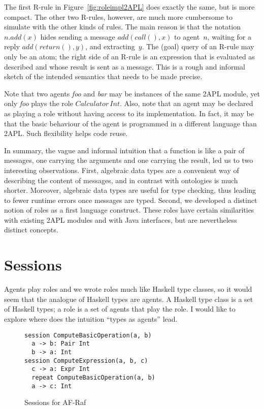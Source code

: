 \documentclass[a4paper,12pt,oneside,fleqn]{book} %
\begin{document}
The first R-rule in Figure~\ref{fig:roleimpl2APL} does exactly the same,
but is more compact. The other two R-rules, however, are much more
cumbersome to simulate with the other kinds of rules. The main reason is
that the notation $n.\mathit{add}(x)$ hides sending a message
$\mathit{add}(\mathit{call}(),x)$ to agent~$n$, waiting for a reply
$\mathit{add}(\mathit{return}(),y)$, and extracting~$y$. The (goal) query
of an R-rule may only be an atom; the right side of an R-rule is an
expression that is evaluated as described and whose result is sent as a
message.  This is a rough and informal sketch of the intended semantics
that needs to be made precise.

Note that two agents \textit{foo} and \textit{bar} may be instances of the
same 2APL module, yet only \textit{foo} plays the role
$\mathit{Calculator}\,\mathit{Int}$. Also, note that an agent may be
declared as playing a role without having access to its implementation. In
fact, it may be that the basic behaviour of the agent is programmed in a
different language than 2APL. Such flexibility helps code reuse.

In summary, the vague and informal intuition that a function is like a pair
of messages, one carrying the arguments and one carrying the result, led us
to two interesting observations. First, algebraic data types are a
convenient way of describing the content of messages, and in contrast with
ontologies is much shorter. Moreover, algebraic data types are useful for
type checking, thus leading to fewer runtime errors once messages are
typed. Second, we developed a distinct notion of roles as a first language
construct. These roles have certain similarities with existing 2APL modules
and with Java interfaces, but are nevertheless distinct concepts.

\section{Sessions} %

Agents play roles and we wrote roles much like Haskell type
classes, so it would seem that the analogue of Haskell types are
agents. A Haskell type class is a set of Haskell types; a role is a
set of agents that play the role. I would like to explore where
does the intuition ``types as agents'' lead.

\begin{figure}\footnotesize %
\begin{verbatim}
session ComputeBasicOperation(a, b)
  a -> b: Pair Int
  b -> a: Int
session ComputeExpression(a, b, c)
  c -> a: Expr Int
  repeat ComputeBasicOperation(a, b)
  a -> c: Int
\end{verbatim}
\caption{Sessions for AF-Raf}\label{fig:sessions}
\end{figure} %
\end{document}
